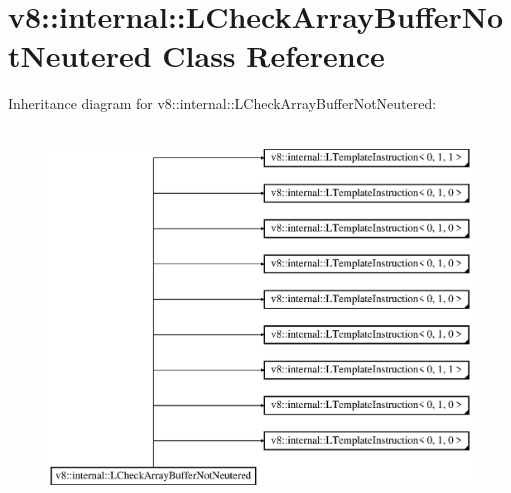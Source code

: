\hypertarget{classv8_1_1internal_1_1_l_check_array_buffer_not_neutered}{}\section{v8\+:\+:internal\+:\+:L\+Check\+Array\+Buffer\+Not\+Neutered Class Reference}
\label{classv8_1_1internal_1_1_l_check_array_buffer_not_neutered}
Inheritance diagram for v8\+:\+:internal\+:\+:L\+Check\+Array\+Buffer\+Not\+Neutered\+:\begin{figure}[H]
\begin{center}
\leavevmode
\includegraphics[height=10.000000cm]{classv8_1_1internal_1_1_l_check_array_buffer_not_neutered}
\end{center}
\end{figure}
